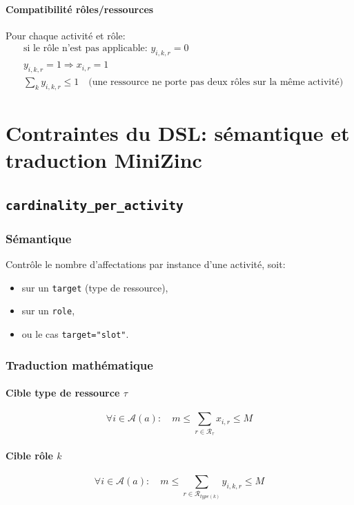 \documentclass[12pt,a4paper]{article}
\begin{document}
\paragraph{Compatibilité rôles/ressources}
Pour chaque activité et rôle:
\begin{align*}
&\text{si le rôle n'est pas applicable: } y_{i,k,r}=0 \\
&y_{i,k,r}=1 \Rightarrow x_{i,r}=1 \\
&\sum_{k} y_{i,k,r}\le 1 \quad \text{(une ressource ne porte pas deux rôles sur la même activité)}
\end{align*}

\section{Contraintes du DSL: sémantique et traduction MiniZinc}
\subsection{\texttt{cardinality\_per\_activity}}
\subsubsection*{Sémantique}
Contrôle le nombre d'affectations par instance d'une activité, soit:
\begin{itemize}
  \item sur un \texttt{target} (type de ressource),
  \item sur un \texttt{role},
  \item ou le cas \texttt{target="slot"}.
\end{itemize}

\subsubsection*{Traduction mathématique}
\paragraph{Cible type de ressource \(\tau\)}
\[
\forall i\in\mathcal{A}(a):\quad
m \le \sum_{r\in \mathcal{R}_\tau} x_{i,r} \le M
\]

\paragraph{Cible rôle \(k\)}
\[
\forall i\in\mathcal{A}(a):\quad
m \le \sum_{r\in \mathcal{R}_{type(k)}} y_{i,k,r} \le M
\]
\end{document}
